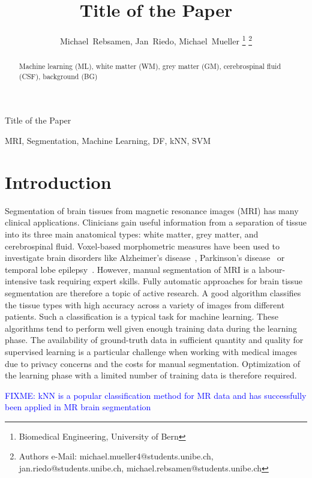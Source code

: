 \documentclass[journal]{IEEEtran}
\newcommand\FIXME[1]{\textcolor{blue}{FIXME: #1}}
\begin{document}
\title{Title of the Paper}


\author{Michael~Rebsamen,
        Jan~Riedo,
        Michael~Mueller%
\thanks{Biomedical Engineering, University of Bern}%
\thanks{Authors e-Mail: michael.mueller4@students.unibe.ch, jan.riedo@students.unibe.ch, michael.rebsamen@students.unibe.ch}}%
%
{Title of the Paper}
\maketitle

\begin{abstract}
Machine learning (ML), white matter (WM), grey matter (GM), cerebrospinal fluid (CSF), background (BG)
\end{abstract}
\begin{IEEEkeywords}
MRI, Segmentation, Machine Learning, DF, kNN, SVM
\end{IEEEkeywords}


\section{Introduction}
Segmentation of brain tissues from magnetic resonance images (MRI) has many clinical applications. Clinicians gain useful information from a separation of tissue into its three main anatomical types: white matter, grey matter, and cerebrospinal fluid. Voxel-based morphometric measures have been used to investigate brain disorders like Alzheimer’s disease~\cite{busatto2003voxel}, Parkinson's disease~\cite{price2004voxel} or temporal lobe epilepsy~\cite{rummel2017personalized}. However, manual segmentation of MRI is a labour-intensive task requiring expert skills. Fully automatic approaches for brain tissue segmentation are therefore a topic of active research. A good algorithm classifies the tissue types with high accuracy across a variety of images from different patients. Such a classification is a typical task for machine learning. These algorithms tend to perform well given enough training data during the learning phase. The availability of ground-truth data in sufficient quantity and quality for supervised learning is a particular challenge when working with medical images due to privacy concerns and the costs for manual segmentation. Optimization of the learning phase with a limited number of training data is therefore required.

\FIXME{kNN is a popular classification method for MR data and has successfully been applied in MR brain segmentation\cite{Anbeek2004,Cocosco2003,Warfield2000}}
\end{document}

